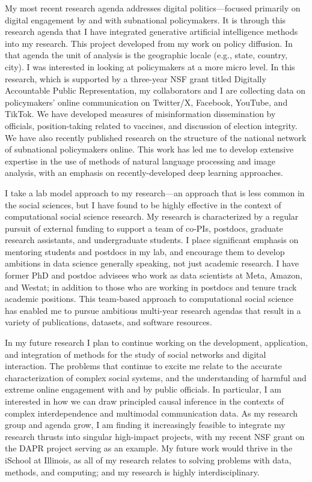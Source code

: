 \documentclass[a4paper]{article}
\begin{document}
My most recent research agenda addresses digital politics---focused primarily on digital engagement by and with subnational policymakers. It is through this research agenda that I have integrated generative artificial intelligence methods into my research. This project developed from my work on policy diffusion. In that agenda the unit of analysis is the geographic locale (e.g., state, country, city). I was interested in looking at policymakers at a more micro level. In this research, which is supported by a three-year NSF grant titled Digitally Accountable Public Representation, my collaborators and I are collecting data on policymakers' online communication on Twitter/X, Facebook, YouTube, and TikTok. We have developed measures of misinformation dissemination by officials, position-taking related to vaccines, and discussion of election integrity. We have also recently published research on the structure of the national network of subnational policymakers online. This work has led me to develop extensive expertise in the use of methods of natural language processing and image analysis, with an emphasis on recently-developed deep learning approaches. 

I take a lab model approach to my research---an approach that is less common in the social sciences, but I have found to be highly effective in the context of computational social science research. My research is characterized by a regular pursuit of external funding to support a team of co-PIs, postdocs, graduate research assistants, and undergraduate students. I place significant emphasis on mentoring students and postdocs in my lab, and encourage them to develop ambitions in data science generally speaking, not just academic research. I have former PhD and postdoc advisees who work as data scientists at Meta, Amazon, and Westat; in addition to those who are working in postdocs and tenure track academic positions. This team-based approach to computational social science has enabled me to pursue ambitious multi-year research agendas that result in a variety of publications, datasets, and software resources. 

In my future research I plan to continue working on the development, application, and integration of methods for the study of social networks and digital interaction. The problems that continue to excite me relate to the accurate characterization of complex social systems, and the understanding of harmful and extreme online engagement with and by public officials. In particular, I am interested in how we can draw principled causal inference in the contexts of complex interdependence and multimodal communication data. As my research group and agenda grow, I am finding it increasingly feasible to integrate my research thrusts into singular high-impact projects, with my recent NSF grant on the DAPR project serving as an example. My future work would thrive in the iSchool at Illinois, as all of my research relates to solving problems with data, methods, and computing; and my research is highly interdisciplinary. 
\end{document}
